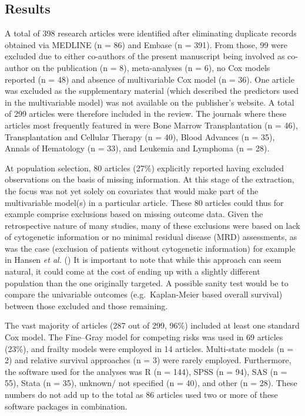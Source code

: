 \documentclass[
  letterpaper,
  paper=240mm:170mm,
  twoside=true,
  open=right,
  fontsize=10pt,
  pagesize=false,
  BCOR=15mm,
  DIV=14,
  headinclude=true,
  footinclude=false,
  headsepline=on]{scrbook}
\begin{document}
\subsection{Results}\label{results}

A total of 398 research articles were identified after eliminating
duplicate records obtained via MEDLINE (n = 86) and Embase (n = 391).
From those, 99 were excluded due to either co-authors of the present
manuscript being involved as co-author on the publication (n = 8),
meta-analyses (n = 6), no Cox models reported (n = 48) and absence of
multivariable Cox model (n = 36). One article was excluded as the
supplementary material (which described the predictors used in the
multivariable model) was not available on the publisher's website. A
total of 299 articles were therefore included in the review. The
journals where these articles most frequently featured in were Bone
Marrow Transplantation (n = 46), Transplantation and Cellular Therapy (n
= 40), Blood Advances (n = 35), Annals of Hematology (n = 33), and
Leukemia and Lymphoma (n = 28).

At population selection, 80 articles (27\%) explicitly reported having
excluded observations on the basis of missing information. At this stage
of the extraction, the focus was not yet solely on covariates that would
make part of the multivariable model(s) in a particular article. These
80 articles could thus for example comprise exclusions based on missing
outcome data. Given the retrospective nature of many studies, many of
these exclusions were based on lack of cytogenetic information or no
minimal residual disease (MRD) assessments, as was the case (exclusion
of patients without cytogenetic information) for example in Hansen
\emph{et al.} () It is
important to note that while this approach can seem natural, it could
come at the cost of ending up with a slightly different population than
the one originally targeted. A possible sanity test would be to compare
the univariable outcomes (e.g.~Kaplan-Meier based overall survival)
between those excluded and those remaining.

The vast majority of articles (287 out of 299, 96\%) included at least
one standard Cox model. The Fine--Gray model for competing risks was
used in 69 articles (23\%), and frailty models were employed in 14
articles. Multi-state models (n = 2) and relative survival approaches (n
= 3) were rarely employed. Furthermore, the software used for the
analyses was R (n = 144), SPSS (n = 94), SAS (n = 55), Stata (n = 35),
unknown/ not specified (n = 40), and other (n = 28). These numbers do
not add up to the total as 86 articles used two or more of these
software packages in combination.
\end{document}
